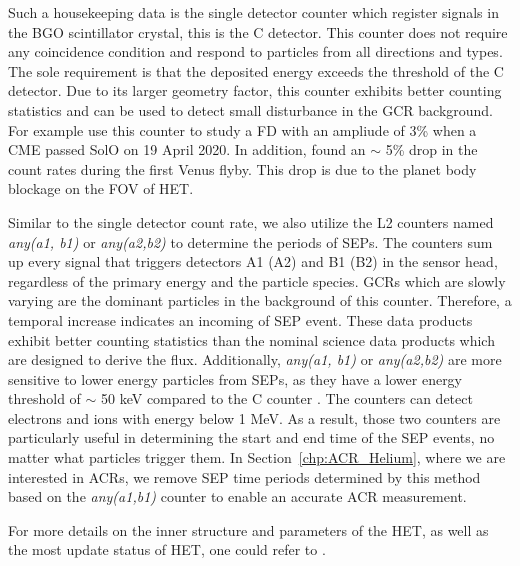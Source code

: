 Such a housekeeping data is the single detector counter which register signals in the \ac{BGO} scintillator crystal, this is the C detector. This counter does not require any coincidence condition and respond to particles from all directions and types. The sole requirement is that the deposited energy exceeds the threshold of the C detector. Due to its larger geometry factor, this counter exhibits better counting statistics and can be used to detect small disturbance in the \ac{GCR} background. For example \citet{Forstner-2021-SolO} use this counter to study a \ac{FD} with an ampliude of 3\% when a \ac{CME} passed \ac{SolO} on 19 April 2020. In addition, \citet{Allen2021AA_venus} found an $\sim$ 5\% drop in the count rates during the first Venus flyby. This drop is due to the planet body blockage on the \ac{FOV} of \ac{HET}.

Similar to the single detector count rate, we also utilize the L2 counters named \textit{any(a1, b1)} or \textit{any(a2,b2)} to determine the periods of \acp{SEP}. The counters sum up every signal that triggers detectors A1 (A2) and B1 (B2) in the sensor head, regardless of the primary energy and the particle species. \acp{GCR} which are slowly varying are the dominant particles in the background of this counter. Therefore, a temporal increase indicates an incoming of \ac{SEP} event. These data products exhibit better counting statistics than the nominal science data products which are designed to derive the flux. Additionally, \textit{any(a1, b1)} or \textit{any(a2,b2)} are more sensitive to lower energy particles from \acp{SEP}, as they have a lower energy threshold of $\sim$ 50 keV compared to the C counter \citep{Elftmann-2020-PhD}. The counters can detect electrons and ions with energy below 1 MeV. As a result, those two counters are particularly useful in determining the start and end time of the \ac{SEP} events, no matter what particles trigger them. In Section~\ref{chp:ACR_Helium}, where we are interested in \acp{ACR}, we remove \ac{SEP} time periods determined by this method based on the \textit{any(a1,b1)} counter to enable an accurate \ac{ACR} measurement.


For more details on the inner structure and parameters of the \ac{HET}, as well as the most update status of \ac{HET}, one could refer to \citet{RodriguezPacheco-2019-EPD, Wimmer2021AA,Elftmann-2020-PhD}.

